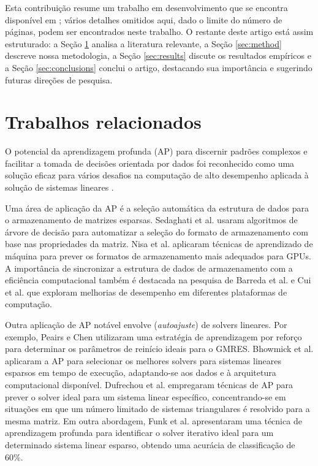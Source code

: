 \documentclass{pssbmac}
\begin{document}
Esta contribuição resume um trabalho em desenvolvimento que 
se encontra disponível em \cite{souza2023}; vários detalhes omitidos aqui, 
dado o limite do número de páginas, podem ser encontrados neste trabalho.
O restante deste artigo está assim estruturado: a Seção \ref{sec:related} 
analisa a literatura relevante, a Seção \ref{sec:method} descreve nossa metodologia, 
a Seção \ref{sec:results} discute os resultados empíricos e a Seção \ref{sec:conclusions} 
conclui o artigo, destacando sua importância e sugerindo futuras direções de pesquisa.

\section{Trabalhos relacionados}\label{sec:related}

O potencial da aprendizagem profunda (AP) para discernir padrões complexos e 
facilitar a tomada de decisões orientada por dados foi reconhecido 
como uma solução eficaz para vários desafios na computação de alto desempenho 
aplicada à solução de sistemas lineares 
\cite{falch2017machine,tuncer2017diagnosing,memeti2019using}.

Uma área de aplicação da AP é a seleção automática da estrutura de dados 
para o armazenamento de matrizes esparsas. Sedaghati et al. \cite{sedaghati2015automatic}
usaram algoritmos de árvore de decisão para automatizar a seleção do formato de 
armazenamento com base nas propriedades da matriz. Nisa et al. \cite{nisa2018effective} 
aplicaram técnicas de aprendizado de máquina para prever os formatos de 
armazenamento mais adequados para GPUs. A importância de sincronizar a estrutura de dados 
de armazenamento com a eficiência computacional também é destacada na pesquisa de 
Barreda et al. \cite{barreda2020performance} e Cui et al. \cite{cui2016code} 
que exploram melhorias de desempenho em diferentes plataformas de computação.

Outra aplicação de AP notável envolve (\emph{autoajuste}) de solvers lineares. 
Por exemplo, Peairs e Chen \cite{peairs2011using} utilizaram uma estratégia de 
aprendizagem por reforço para determinar os parâmetros de reinício ideais para o 
GMRES. Bhowmick et al. \cite{bhowmick2006application} aplicaram a AP para selecionar 
os melhores solvers para sistemas lineares esparsos em tempo de execução, 
adaptando-se aos dados e à arquitetura computacional disponível. 
Dufrechou et al. \cite{dufrechou2019automatic} empregaram técnicas de AP 
para prever o solver ideal para um sistema linear específico, concentrando-se 
em situações em que um número limitado de sistemas triangulares é resolvido para a 
mesma matriz. 
Em outra abordagem, Funk et al. \cite{funk2022prediction} apresentaram uma técnica de 
aprendizagem profunda para identificar o solver iterativo ideal para 
um determinado sistema linear esparso, obtendo uma acurácia de classificação de 60\%.
\end{document}
